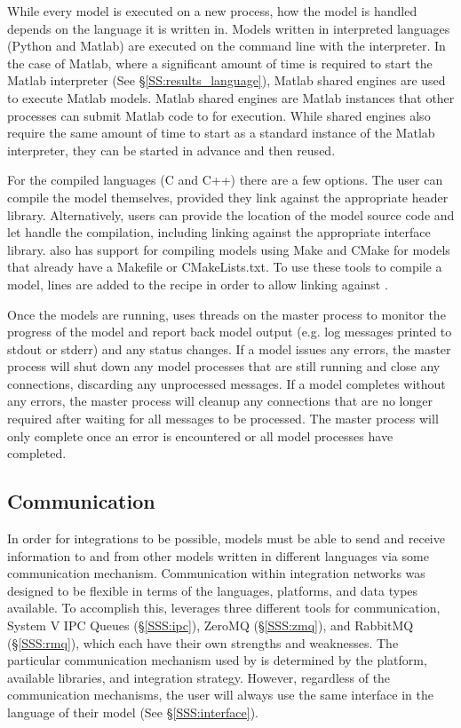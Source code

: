 \documentclass[journal]{IEEEtran}
\newcommand{\todo}[1]{{\color{red}{#1}}}
\newcommand{\pkg}{{\tt \todo{cis\_interface}}{}}
\begin{document}
While every model is executed on a new process, how the model is handled depends 
on the language it is written in. Models written in 
interpreted languages (Python and Matlab) are executed on the command line 
with the interpreter. In the case of Matlab, where a significant amount of time is required to start 
the Matlab interpreter (See \S\ref{SS:results_language}), Matlab shared engines are used 
to execute Matlab models. Matlab shared engines are Matlab instances that other processes can 
submit Matlab code to for execution. While shared engines also require the same amount of time 
to start as a standard instance of the Matlab interpreter, they can be started in advance and then 
reused.

For the compiled languages (C and C++) there are a few options. The user can 
compile the model themselves, provided they link against the appropriate 
{\pkg} header library. Alternatively, users can provide the location of 
the model source code and let {\pkg} handle the compilation, including 
linking against the appropriate {\pkg} interface library. {\pkg} 
also has support for compiling models using Make \citep{Stallman2004} and 
CMake \citep{Martin2006} for 
models that already have a Makefile or CMakeLists.txt. To use these tools to compile a model, 
lines are added to the recipe in order to allow linking against {\pkg}.

Once the models are running, {\pkg} uses threads on the master process to monitor the progress of the model and report back model output (e.g. log messages printed to stdout or stderr) and any status changes. If a model issues any errors, the master process will shut down any model processes that are still running and close any connections, discarding any unprocessed messages. If a model completes without any errors, the master process will cleanup any connections that are no longer required after waiting for all messages to be processed. The master process will only complete once an error is encountered or all model processes have completed.


\subsection{Communication}\label{SS:communication}
%
In order for integrations to be possible, models must be able to send and receive information to and from other models written in different languages via some communication mechanism. 
Communication within {\pkg} integration networks was designed to be flexible in terms of the 
languages, platforms, and data types available. To accomplish this, {\pkg} leverages 
three different tools for communication, 
System V IPC Queues (\S\ref{SSS:ipc}), ZeroMQ (\S\ref{SSS:zmq}), and RabbitMQ (\S\ref{SSS:rmq}), 
which each have their own strengths and weaknesses. The 
particular communication mechanism used by {\pkg} is determined by the platform, available libraries, and integration strategy. However, regardless of the communication mechanisms, the user will always use the same interface in the language of their model (See \S\ref{SSS:interface}). 
\end{document}
